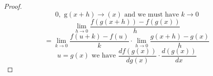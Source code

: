 \documentclass[12pt]{article}
\numberwithin{equation}{section}
\theoremstyle{definition}
\begin{document}
\begin{proof}
\begin{equation*}
0,\mbox{ g}(x+h)\rightarrow(x)\mbox{ and we must have }k\rightarrow{0}\end{equation*}
\newline\newline
{}
\begin{equation*}\lim_{h \to 0}\frac{f(g(x+h))-f(g(x))}{h}\end{equation*}
\begin{equation*}=\lim_{k \to 0}\frac{f(u+k)-f(u)}{k}\cdot\lim_{h \to 0}\frac{g(x+h)-g(x)}{h}\end{equation*}
\newline\newline
{}
\begin{equation*}u=g(x)\mbox{ we have }\frac{df(g(x))}{dg(x)}\cdot\frac{d(g(x))}{dx}\end{equation*}
\end{proof}
\end{document}
